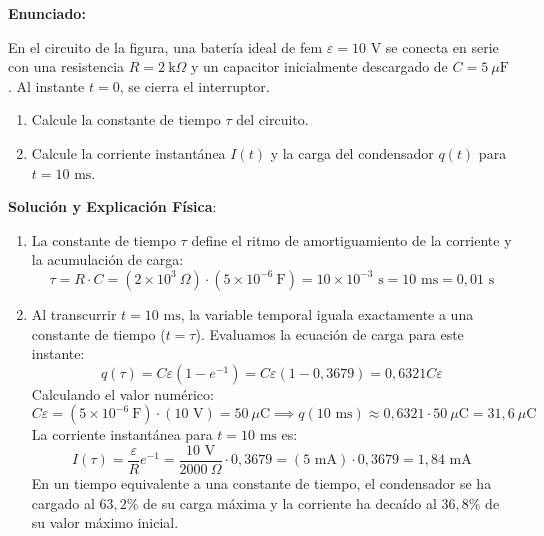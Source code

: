 \documentclass[12pt, a4paper]{article}
\newenvironment{ejercicio}[1]{
  \begin{mdframed}[
    linecolor=ejercicioline, linewidth=1.5pt, roundcorner=8pt, backgroundcolor=ejercicioback,
    skipabove=14pt, skipbelow=14pt,
    frametitle={\color{white}\bfseries Ejercicio Modelo: #1},
    frametitlebackgroundcolor=ejercicioline,
    frametitleaboveskip=6pt, frametitlebelowskip=6pt
  ]
  \textbf{Enunciado:}\par\medskip
}{
  \end{mdframed}
}
\begin{document}
\begin{ejercicio}{Circuito Transitorio RC}
En el circuito de la figura, una batería ideal de fem $\varepsilon = 10\text{ V}$ se conecta en serie con una resistencia $R = 2\ \text{k}\Omega$ y un capacitor inicialmente descargado de $C = 5\ \mu\text{F}$. Al instante $t=0$, se cierra el interruptor.
\begin{enumerate}
    \item Calcule la constante de tiempo $\tau$ del circuito.
    \item Calcule la corriente instantánea $I(t)$ y la carga del condensador $q(t)$ para $t = 10\text{ ms}$.
\end{enumerate}

\medskip
\textbf{Solución y Explicación Física}:
\begin{enumerate}
    \item La constante de tiempo $\tau$ define el ritmo de amortiguamiento de la corriente y la acumulación de carga:
    \[
    \tau = R \cdot C = (2 \times 10^3\ \Omega) \cdot (5 \times 10^{-6}\ \text{F}) = 10 \times 10^{-3}\text{ s} = 10\text{ ms} = 0{,}01\text{ s}
    \]
    
    \item Al transcurrir $t = 10\text{ ms}$, la variable temporal iguala exactamente a una constante de tiempo ($t = \tau$). 
    Evaluamos la ecuación de carga para este instante:
    \[
    q(\tau) = C\varepsilon (1 - e^{-1}) = C\varepsilon (1 - 0{,}3679) = 0{,}6321 C\varepsilon
    \]
    Calculando el valor numérico:
    \[
    C\varepsilon = (5 \times 10^{-6}\ \text{F}) \cdot (10\text{ V}) = 50\ \mu\text{C} \implies q(10\text{ ms}) \approx 0{,}6321 \cdot 50\ \mu\text{C} = \boxed{31{,}6\ \mu\text{C}}
    \]
    La corriente instantánea para $t = 10\text{ ms}$ es:
    \[
    I(\tau) = \frac{\varepsilon}{R} e^{-1} = \frac{10\text{ V}}{2000\ \Omega} \cdot 0{,}3679 = (5\text{ mA}) \cdot 0{,}3679 = \boxed{1{,}84\text{ mA}}
    \]
    En un tiempo equivalente a una constante de tiempo, el condensador se ha cargado al $63{,}2\%$ de su carga máxima y la corriente ha decaído al $36{,}8\%$ de su valor máximo inicial.
\end{enumerate}
\end{ejercicio}
\end{document}
